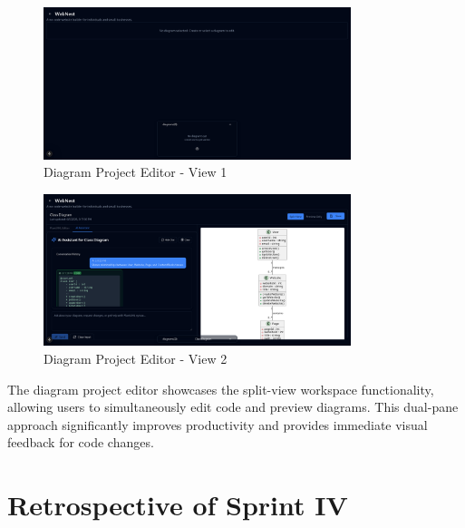 \begin{figure}[H]
\centering
\includegraphics[width=0.8\textwidth]{screenshots/edit-diagram-project.png}
\caption{Diagram Project Editor - View 1}
\end{figure}

\begin{figure}[H]
\centering
\includegraphics[width=0.8\textwidth]{screenshots/edit-diagram-project-2.png}
\caption{Diagram Project Editor - View 2}
\end{figure}

The diagram project editor showcases the split-view workspace functionality, allowing users to simultaneously edit code and preview diagrams. This dual-pane approach significantly improves productivity and provides immediate visual feedback for code changes.

\section{Retrospective of Sprint IV}

